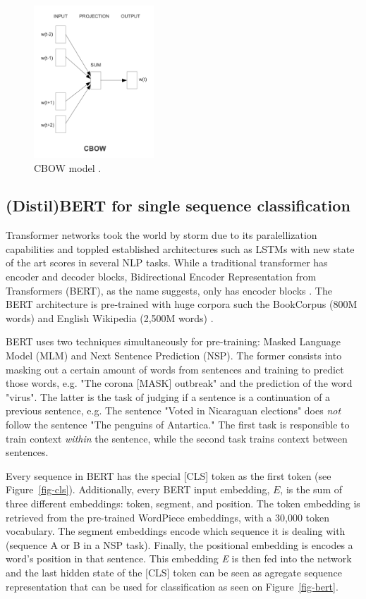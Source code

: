 \begin{figure}[!h]
	\centering
	\includegraphics[width=0.4\textwidth]{../img/cbow.png}
	\caption{CBOW model \citep{mikolov2013efficient}.}
	\label{cbow}
\end{figure}

\subsection{(Distil)BERT for single sequence classification}

Transformer networks took the world by storm due to its paralellization capabilities and toppled established architectures such as LSTMs with new state of the art scores in several NLP tasks. While a traditional transformer has encoder and decoder blocks, Bidirectional Encoder Representation from Transformers (BERT), as the name suggests, only has encoder blocks \citep{halthor2020}. The BERT architecture is pre-trained with huge corpora such the BookCorpus (800M words) and English Wikipedia (2,500M words) \citep{devlin2019bert}.

BERT uses two techniques simultaneously for pre-training: Masked Language Model (MLM) and Next Sentence Prediction (NSP). The former consists into masking out a certain amount of words from sentences and training to predict those words, e.g. "The corona [MASK] outbreak" and the prediction of the word "virus". The latter is the task of judging if a sentence is a continuation of a previous sentence, e.g. The sentence "Voted in Nicaraguan elections" does \textit{not} follow the sentence "The penguins of Antartica." The first task is responsible to train context \textit{within} the sentence, while the second task trains context between sentences.

Every sequence in BERT has the special [CLS] token as the first token (see Figure~\ref{fig-cls}). Additionally, every BERT input embedding, $\mathit{E}$, is the sum of three different embeddings: token, segment, and position. The token embedding is retrieved from the pre-trained WordPiece embeddings, with a 30,000 token vocabulary. The segment embeddings encode which sequence it is dealing with (sequence A or B in a NSP task). Finally, the positional embedding is encodes a word's position in that sentence. This embedding \textit{E} is then fed into the network and the last hidden state of the [CLS] token can be seen as agregate sequence representation that can be used for classification \citep{devlin2019bert} as seen on Figure~\ref{fig-bert}.

